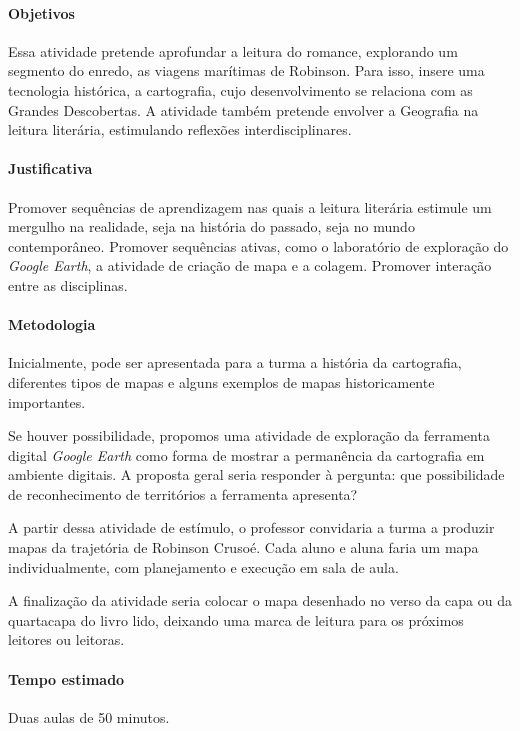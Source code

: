 \documentclass[12pt]{extarticle}
\begin{document}
\paragraph{Objetivos}

Essa atividade pretende aprofundar a leitura do romance, explorando um
segmento do enredo, as viagens marítimas de Robinson. Para isso, insere
uma tecnologia histórica, a cartografia, cujo desenvolvimento se
relaciona com as Grandes Descobertas. A atividade também pretende
envolver a Geografia na leitura literária, estimulando reflexões
interdisciplinares.

\paragraph{Justificativa}
Promover sequências de aprendizagem nas quais a leitura literária
estimule um mergulho na realidade, seja na história do passado, seja no
mundo contemporâneo. Promover sequências ativas, como o laboratório de
exploração do \emph{Google Earth}, a atividade de criação de mapa e a colagem.
Promover interação entre as disciplinas.

\paragraph{Metodologia}
Inicialmente, pode ser apresentada para a turma a história da cartografia,
diferentes tipos de mapas e alguns exemplos de mapas historicamente
importantes.

Se houver possibilidade, propomos uma atividade de exploração da
ferramenta digital \emph{Google Earth} como forma de mostrar a permanência da
cartografia em ambiente digitais. A proposta geral seria responder à
pergunta: que possibilidade de reconhecimento de territórios a
ferramenta apresenta?

A partir dessa atividade de estímulo, o professor convidaria a turma a
produzir mapas da trajetória de Robinson Crusoé. Cada aluno e aluna
faria um mapa individualmente, com planejamento e execução em sala de
aula.

A finalização da atividade seria colocar o mapa desenhado no verso da capa
ou da quartacapa do livro lido, deixando uma marca de leitura para os
próximos leitores ou leitoras.

\paragraph{Tempo estimado} Duas aulas de 50 minutos.
\end{document}
